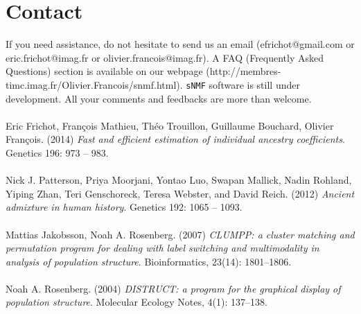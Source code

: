 \documentclass[10pt,a4paper]{article}
\begin{document}
\section{Contact}
If you need assistance, do not hesitate to send us an email (efrichot@gmail.com or eric.frichot@imag.fr or olivier.francois@imag.fr). 
A FAQ (Frequently Asked Questions) section is available 
on our webpage (http://membres-timc.imag.fr/Olivier.Francois/snmf.html). 
{\tt sNMF} software is still under development. All your comments and feedbacks are more than welcome.\\
\\
\noindent
[1] Eric Frichot, François Mathieu, Théo Trouillon, Guillaume Bouchard, Olivier François. (2014) {\it Fast and efficient estimation of individual ancestry coefficients}. Genetics 196: 973 -- 983.\\ 
\\
\noindent
[2]  Nick J. Patterson, Priya Moorjani, Yontao Luo, Swapan Mallick, Nadin Rohland, Yiping Zhan, Teri
Genschoreck, Teresa Webster, and David Reich. (2012) {\it Ancient admixture in human history}. Genetics
192: 1065 -- 1093.\\
\\
\noindent
[3] Mattias Jakobsson, Noah A. Rosenberg. (2007) {\it CLUMPP: a cluster matching and permutation program for dealing with label switching and multimodality in analysis of population structure}. Bioinformatics, 23(14): 1801--1806.
\\
\\
\noindent
[4] Noah A. Rosenberg. (2004) {\it DISTRUCT: a program for the graphical display of population structure}. Molecular Ecology Notes, 4(1): 137--138.
\end{document}
